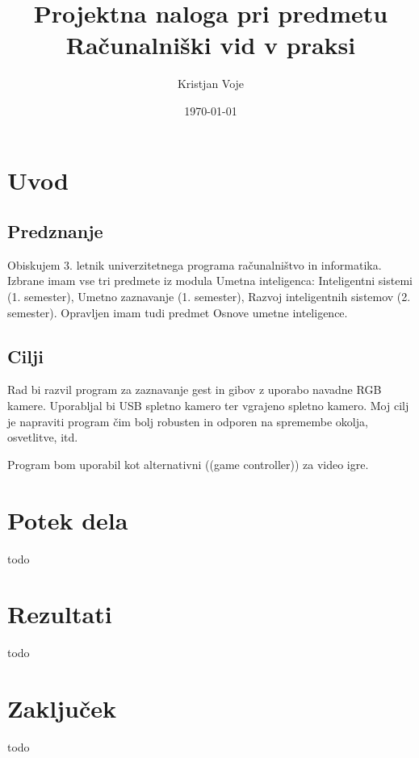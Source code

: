 \documentclass[a4paper, 12pt]{article}
\title{	Projektna naloga pri predmetu \\
		Računalniški vid v praksi	}
\author{Kristjan Voje}
\date{\today}
\begin{document}
\maketitle
\section{Uvod}
\subsection{Predznanje}
Obiskujem 3. letnik univerzitetnega programa računalništvo in informatika.
Izbrane imam vse tri predmete iz modula Umetna inteligenca: Inteligentni sistemi (1. semester), Umetno zaznavanje (1. semester), Razvoj inteligentnih sistemov (2. semester).
Opravljen imam tudi predmet Osnove umetne inteligence.

\subsection{Cilji}
Rad bi razvil program za zaznavanje gest in gibov z uporabo navadne RGB kamere. Uporabljal bi USB spletno kamero ter vgrajeno spletno kamero. Moj cilj je napraviti program čim bolj robusten in odporen na spremembe okolja, osvetlitve, itd.

Program bom uporabil kot alternativni ((game controller)) za video igre.

\section{Potek dela}
todo

\section{Rezultati}
todo

\section{Zaključek}
todo
\end{document}
